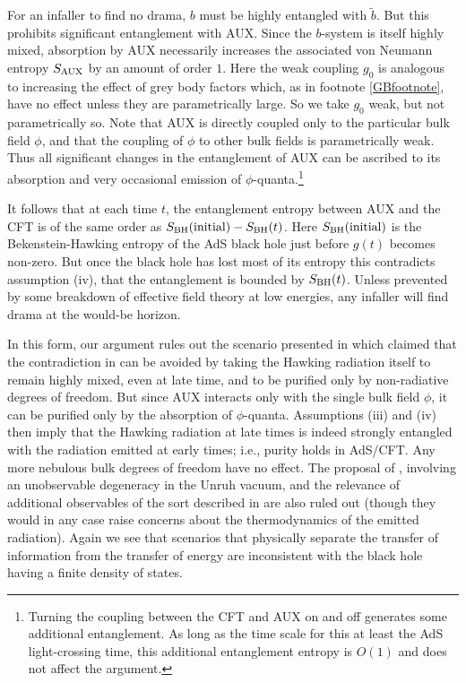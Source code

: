 \documentclass[12pt]{article}
\begin{document}
{For an infaller to find no drama, $b$ must be highly entangled with $\tilde b$.   But this prohibits significant entanglement with AUX.  Since the $b$-system is itself highly mixed, absorption by AUX necessarily increases the associated von Neumann entropy $S_{\rm AUX}$ by an amount of order $1$.  Here the weak coupling $g_0$ is analogous to increasing the effect of grey body factors which, as in footnote \ref{GBfootnote}, have no effect unless they are parametrically large.  So we take $g_0$ weak, but not parametrically so.  Note that AUX is directly coupled only to the particular bulk field $\phi$, and that the coupling of $\phi$ to other bulk fields is parametrically weak.  Thus all significant changes in the entanglement of AUX can be ascribed to its absorption and very occasional emission of $\phi$-quanta.\footnote{Turning the coupling between the CFT and AUX on and off generates some additional entanglement.  As long as the time scale for this at least the AdS light-crossing time, this additional entanglement entropy is $O(1)$ and does not affect the argument.}


It follows that at each time $t$, %
{the entanglement entropy between AUX and the CFT}
 is of the same order as $S_{\rm BH}({\rm initial}) - S_{\rm BH}(t)$.  Here $S_{\rm BH}({\rm initial})$ is the Bekenstein-Hawking entropy of the AdS black hole just before $g(t)$ becomes non-zero.   But once the black hole has lost most of its entropy this contradicts assumption (iv), that the entanglement is bounded by $S_{\rm BH}(t)$.  Unless prevented by some breakdown of effective field theory at low energies, any infaller will find drama at the would-be horizon.

In this form, our argument rules out the scenario presented in \cite{Jacobson:2012gh} which claimed that the contradiction in \cite{Almheiri:2012rt} can be avoided by taking the Hawking radiation itself to remain highly mixed, even at late time, and to be purified only by non-radiative degrees of freedom. But since AUX interacts only with the single bulk field $\phi$, it can be purified only by the absorption of $\phi$-quanta.  Assumptions (iii) and (iv) then imply that the Hawking radiation at late times is indeed strongly entangled with the radiation emitted at early times; i.e., purity holds in AdS/CFT.   Any more nebulous bulk degrees of freedom have no effect.  The proposal of \cite{Hossenfelder:2012mr}, involving an unobservable degeneracy in the Unruh vacuum, and the relevance of additional observables of the sort described in \cite{Gambini:2013ooa} are also ruled out (though they would in any case  raise concerns about the thermodynamics of the emitted radiation). Again we see that scenarios that physically separate the transfer of information from the transfer of energy are inconsistent with the black hole having a finite density of states.


}
\end{document}
